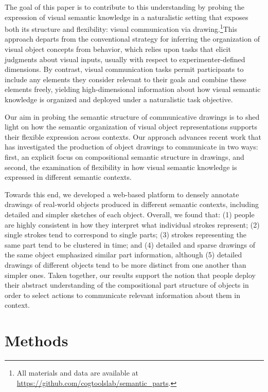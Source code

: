\documentclass[10pt,letterpaper]{article}
\begin{document}
The goal of this paper is to contribute to this understanding by probing the expression of visual semantic knowledge in a naturalistic setting that exposes both its structure and flexibility: visual communication via drawing.\footnote{All materials and data are available at \url{https://github.com/cogtoolslab/semantic_parts}.}This approach departs from the conventional strategy for inferring the organization of visual object concepts from behavior, which relies upon tasks that elicit judgments about visual inputs, usually with respect to experimenter-defined dimensions. 
By contrast, visual communication tasks permit participants to include any elements they consider relevant to their goals and combine these elements freely, yielding high-dimensional information about how visual semantic knowledge is organized and deployed under a naturalistic task objective. 

Our aim in probing the semantic structure of communicative drawings is to shed light on how the semantic organization of visual object representations supports their flexible expression across contexts. 
Our approach advances recent work \cite{FanCommon2018,long2018drawings} that has investigated the production of object drawings to communicate in two ways: first, an explicit focus on compositional semantic structure in drawings, and second, the examination of flexibility in how visual semantic knowledge is expressed in different semantic contexts. 

Towards this end, we developed a web-based platform to densely annotate drawings of real-world objects produced in different semantic contexts, including detailed and simpler sketches of each object. 
Overall, we found that: (1) people are highly consistent in how they interpret what individual strokes represent; (2) single strokes tend to correspond to single parts; (3) strokes representing the same part tend to be clustered in time; and (4) detailed and sparse drawings of the same object emphasized similar part information, although (5) detailed drawings of different objects tend to be more distinct from one another than simpler ones. 
Taken together, our results support the notion that people deploy their abstract understanding of the compositional part structure of objects in order to select actions to communicate relevant information about them in context. 

\section{Methods}
\end{document}

